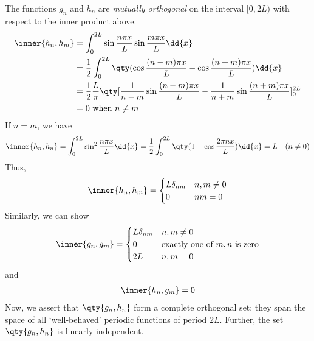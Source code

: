 The functions $g_n$ and $h_n$ are \textit{mutually orthogonal} on the interval $[0, 2L)$ with respect to the inner product above.
\begin{align*}
    \inner{h_n, h_m} & = \int_0^{2L} \sin \frac{n\pi x}{L} \sin \frac{m\pi x}{L} \dd{x} \\
    & = \frac{1}{2} \int_0^{2L} \qty(\cos\frac{(n-m)\pi x}{L} - \cos \frac{(n+m)\pi x}{L}) \dd{x} \\
    & = \frac{1}{2} \frac{L}{\pi} \qty[ \frac{1}{n-m}\sin\frac{(n-m)\pi x}{L} - \frac{1}{n+m} \sin \frac{(n+m)\pi x}{L} ]_0^{2L} \\
    & = 0 \text{ when } n \neq m
\end{align*}
If $n = m$, we have
\begin{align*}
    \inner{h_n, h_n} = \int_0^{2L} \sin^2 \frac{n\pi x}{L} \dd{x} = \frac{1}{2} \int_0^{2L} \qty(1-\cos \frac{2\pi n x}{L}) \dd{x} = L \quad (n \neq 0)
\end{align*}
Thus,
\begin{align} \label{eq:1.1}
    \inner{h_n, h_m} = \begin{cases}
        L \delta_{nm} & n,m \neq 0 \\
        0             & nm = 0
    \end{cases}
\end{align}
Similarly, we can show
\begin{align} \label{eq:1.2}
    \inner{g_n, g_m} = \begin{cases}
        L \delta_{nm} & n,m \neq 0                                 \\
        0             & \text{exactly one of } m,n \text{ is zero} \\
        2L            & n,m = 0
    \end{cases}
\end{align}
and
\begin{align} \label{eq:1.3}
    \inner{h_n, g_m} = 0
\end{align}
Now, we assert that $\qty{g_n, h_n}$ form a complete orthogonal set; they span the space of all `well-behaved' periodic functions of period $2L$.
Further, the set $\qty{g_n, h_n}$ is linearly independent.

